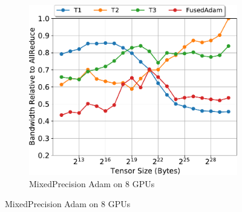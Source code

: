 \begin{figure}
\begin{subfigure}{0.66\columnwidth}
    \includegraphics[width=\columnwidth]{figures/results-adamfp16-8-gpus.pdf} 
    \caption{MixedPrecision Adam on 8 GPUs} 
  \end{subfigure}


\end{figure}
